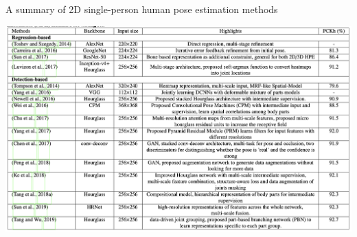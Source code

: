 \documentclass[11pt, letterpaper]{article}
\begin{document}
\begin{table}[h]
  \centering
  \caption{A summary of 2D single-person human pose estimation methods \cite{Chen_2020}}
  \includegraphics[width=1\textwidth]{summary_2d_1ppl_hpe}
  \label{tab:table_2d_hpe}
\end{table}
\end{document}
